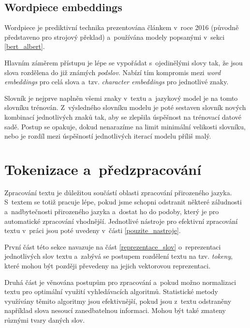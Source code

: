 \subsection{Wordpiece embeddings}
\label{wordpiece_embb}
Wordpiece je prediktivní technika prezentována článkem \cite{wordpiece} v~roce 2016 (původně představeno pro strojový překlad) a~používána modely popsanými v~sekci \ref{bert_albert}.\par
Hlavním záměrem přístupu je lépe se vypořádat s~ojedinělými slovy tak, že jsou slova rozdělena do již známých \emph{podslov}. Nabízí tím kompromis mezi \emph{word embeddings} pro celá slova a~tzv. \emph{character embeddings} pro jednotlivé znaky.\par
Slovník je nejprve naplněn všemi znaky v~textu a~jazykový model je na tomto slovníku trénován. Z~výsledného slovníku modelu je poté sestaven slovník nových kombinací jednotlivých znaků tak, aby se zlepšila úspěšnost na trénovací datové sadě. Postup se opakuje, dokud nenarazíme na limit minimální velikosti slovníku, nebo je rozdíl mezi úspěšností jednotlivých iterací modelu příliš malý.

\section{Tokenizace a~předzpracování}
\label{preprocessing}
Zpracování textu je důležitou součástí oblasti zpracování přirozeného jazyka. S~textem se totiž pracuje lépe, pokud jsme schopni odstranit některé záludnosti a~nadbytečnosti přirozeného jazyka a~dostat ho do podoby, který je pro automatické zpracování vhodnější. Jednotlivé nástroje pro efektivní zpracování textu v~práci jsou poté uvedeny v~části \ref{pouzite_nastroje}.\par
První část této sekce navazuje na část \ref{reprezentace_slov} o~reprezentaci jednotlivých slov textu a~zabývá se postupem rozdělení textu na tzv. \emph{tokeny}, které mohou být později převedeny na jejich vektorovou reprezentaci.\par
Druhá část je věnována postupům pro zpracování a~pokud možno normalizaci textu pro optimální využití vyhledávacích algoritmů. Statistické metody využívány těmito algoritmy jsou efektivnější, pokud jsou z~textu odstraněny například slova nesoucí zanedbatelnou informaci. Mohou být také zmateny různými tvary daných slov.

